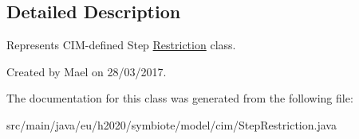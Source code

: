 \subsection{Detailed Description}
Represents C\+I\+M-\/defined Step \hyperlink{classeu_1_1h2020_1_1symbiote_1_1model_1_1cim_1_1Restriction}{Restriction} class.

Created by Mael on 28/03/2017. 

The documentation for this class was generated from the following file\+:\begin{DoxyCompactItemize}
\item 
src/main/java/eu/h2020/symbiote/model/cim/Step\+Restriction.\+java\end{DoxyCompactItemize}
